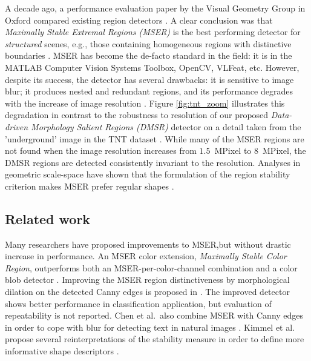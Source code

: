 \documentclass[conference,compsoc]{IEEEtran}
\begin{document}
A decade ago, a performance evaluation paper by the Visual Geometry Group in Oxford compared existing region detectors \cite{Mikolajczyk:2005}. 
A clear conclusion was that {\em  Maximally Stable Extremal Regions (MSER)} is the best performing detector for {\em structured} scenes, e.g., those containing homogeneous regions with distinctive boundaries \cite{Matas2002BMVC}. MSER has become the de-facto standard in the field: it is in the MATLAB Computer Vision Systems Toolbox, OpenCV, VLFeat, etc. However, despite its success, the detector has several drawbacks: it is sensitive to image blur; it produces nested and redundant regions, and its performance degrades with the increase of image resolution \cite{CorRos2013}. Figure \ref{fig:tnt_zoom} illustrates this degradation in contrast to the robustness to resolution of our proposed {\em Data-driven Morphology Salient Regions (DMSR)} detector on a detail taken from the 'underground' image in the TNT dataset \cite{CorRos2013}. While many of the MSER regions are not found when the image resolution increases from $1.5$~MPixel to $8$~MPixel, the DMSR regions are detected consistently invariant to the resolution. Analyses in geometric scale-space have shown that the formulation of the region stability criterion makes MSER prefer regular shapes \cite{Kimmel11}.

\subsection{Related work}
Many researchers have proposed improvements to MSER,but without drastic increase in performance. An MSER color extension, {\em Maximally Stable Color Region}, outperforms both an MSER-per-color-channel combination and a color blob detector \cite{Forssen07}. Improving the MSER region distinctiveness by morphological dilation on the detected Canny edges is proposed in \cite{Wang14}. The improved detector shows better performance in classification application, but evaluation of repeatability is not reported. 
Chen et al.~also combine MSER with Canny edges in order to cope with blur for detecting text in natural images \cite{Chen11}.
Kimmel et al. %
propose several reinterpretations of the stability measure in order to define more informative shape descriptors \cite{Kimmel11}. 
\end{document}
